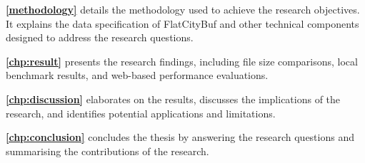 \textbf{\autoref{methodology}} details the methodology used to achieve the research objectives. It explains the data specification of FlatCityBuf and other technical components designed to address the research questions.

\textbf{\autoref{chp:result}} presents the research findings, including file size comparisons, local benchmark results, and web-based performance evaluations.

\textbf{\autoref{chp:discussion}} elaborates on the results, discusses the implications of the research, and identifies potential applications and limitations.

\textbf{\autoref{chp:conclusion}} concludes the thesis by answering the research questions and summarising the contributions of the research.